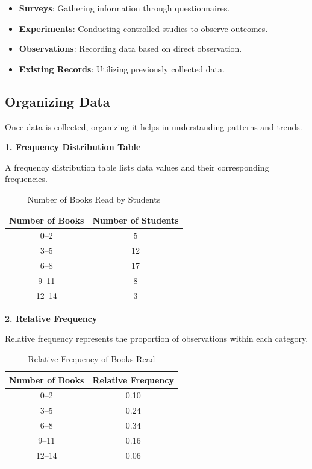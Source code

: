 \documentclass[twoside]{book}
\begin{document}
\begin{itemize}
    \item \textbf{Surveys}: Gathering information through questionnaires.
    \item \textbf{Experiments}: Conducting controlled studies to observe outcomes.
    \item \textbf{Observations}: Recording data based on direct observation.
    \item \textbf{Existing Records}: Utilizing previously collected data.
\end{itemize}

\subsection{Organizing Data}

Once data is collected, organizing it helps in understanding patterns and trends.

\textbf{1. Frequency Distribution Table}

A frequency distribution table lists data values and their corresponding frequencies.

\begin{table}[h]
\centering
\begin{tabular}{c|c}
\hline
\textbf{Number of Books} & \textbf{Number of Students} \\
\hline
0--2 & 5 \\
3--5 & 12 \\
6--8 & 17 \\
9--11 & 8 \\
12--14 & 3 \\
\hline
\end{tabular}
\caption{Number of Books Read by Students}
\end{table}

\textbf{2. Relative Frequency}

Relative frequency represents the proportion of observations within each category.

\begin{table}[h]
\centering
\begin{tabular}{c|c}
\hline
\textbf{Number of Books} & \textbf{Relative Frequency} \\
\hline
0--2 & 0.10 \\
3--5 & 0.24 \\
6--8 & 0.34 \\
9--11 & 0.16 \\
12--14 & 0.06 \\
\hline
\end{tabular}
\caption{Relative Frequency of Books Read}
\end{table}
\end{document}
